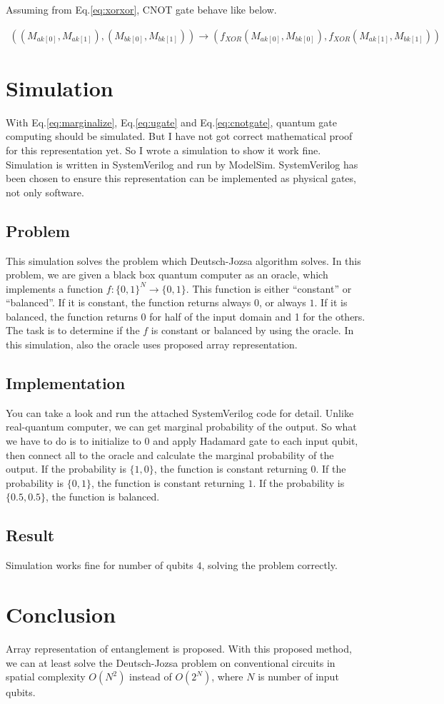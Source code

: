 \documentclass[dvipdfmx]{article}
\begin{document}
Assuming from Eq.\ref{eq:xorxor}, CNOT gate behave like below.

\begin{eqnarray}
\left( (M_{ak[0]}, M_{ak[1]}), (M_{bk[0]}, M_{bk[1]}) \right)
\to
\left( f_{XOR}(M_{ak[0]}, M_{bk[0]}), f_{XOR}(M_{ak[1]}, M_{bk[1]}) \right)
\label{eq:cnotgate}
\end{eqnarray}



\section{Simulation}
With Eq.\ref{eq:marginalize}, Eq.\ref{eq:ugate} and Eq.\ref{eq:cnotgate}, quantum gate computing should be simulated.
But I have not got correct mathematical proof for this representation yet.
So I wrote a simulation to show it work fine.
Simulation is written in SystemVerilog and run by ModelSim.
SystemVerilog has been chosen to ensure this representation can be implemented as physical gates, not only software.

\subsection{Problem}
This simulation solves the problem which Deutsch-Jozsa algorithm solves.
In this problem, we are given a black box quantum computer as an oracle,
 which implements a function $f:\{0,1\}^{N} \to \{0,1\}$.
This function is either ``constant'' or ``balanced''.
If it is constant, the function returns always $0$, or always $1$.
If it is balanced, the function returns 0 for half of the input domain and 1 for the others.
The task is to determine if the $f$ is constant or balanced by using the oracle.
In this simulation, also the oracle uses proposed array representation.

\subsection{Implementation}
You can take a look and run the attached SystemVerilog code for detail.
Unlike real-quantum computer, we can get marginal probability of the output.
So what we have to do is to initialize to $0$ and apply Hadamard gate to each input qubit,
 then connect all to the oracle and calculate the marginal probability of the output.
If the probability is $\{1, 0\}$, the function is constant returning $0$.
If the probability is $\{0, 1\}$, the function is constant returning $1$.
If the probability is $\{0.5, 0.5\}$, the function is balanced.

\subsection{Result}
Simulation works fine for number of qubits $4$, solving the problem correctly.


\section{Conclusion}
Array representation of entanglement is proposed.
With this proposed method,
 we can at least solve the Deutsch-Jozsa problem on conventional circuits
 in spatial complexity $O(N^{2})$ instead of $O(2^{N})$,
 where $N$ is number of input qubits.
\end{document}
